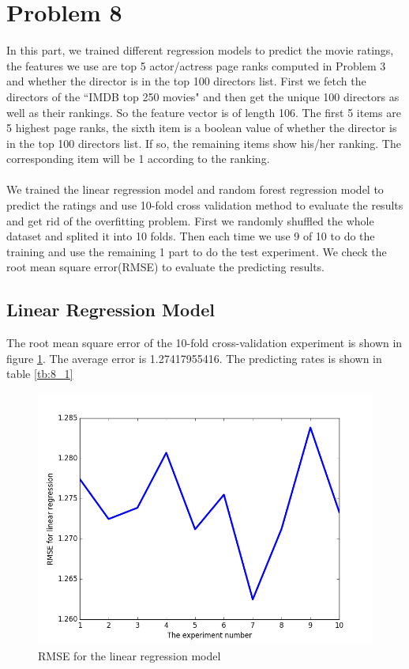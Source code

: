 \documentclass{article}
\begin{document}
\section{Problem 8}
In this part, we trained different regression models to predict the movie ratings, the features we use are top 5 actor/actress page ranks computed in Problem 3 and whether the director is in the top 100 directors list. First we fetch the directors of the ``IMDB top 250 movies" and then get the unique 100 directors as well as their rankings. So the feature vector is of length 106. The first 5 items are 5 highest page ranks, the sixth item is a boolean value of whether the director is in the top 100 directors list. If so, the remaining items show his/her ranking. The corresponding item will be 1 according to the ranking.\\
\\
We trained the linear regression model and random forest regression model to predict the ratings and use 10-fold cross validation method to evaluate the results and get rid of the overfitting problem. First we randomly shuffled the whole dataset and splited it into 10 folds. Then each time we use 9 of 10 to do the training and use the remaining 1 part to do the test experiment. We check the root mean square error(RMSE) to evaluate the predicting results.
\subsection{Linear Regression Model}
The root mean square error of the 10-fold cross-validation experiment is shown in figure \ref{fig:8_1}. The average error is 1.27417955416. The predicting rates is shown in table \ref{tb:8_1}

\begin{figure}[htbp]
\centering
\includegraphics[width=.6\textwidth]{linear.png}
\caption{RMSE for the linear regression model}
\label{fig:8_1}
\end{figure}
\end{document}
